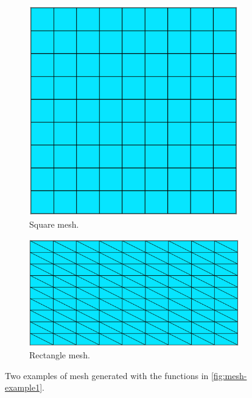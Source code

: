 \documentclass[headings=standardclasses, abstract=true]{scrartcl}
\begin{document}
\begin{figure}
    \centering
    \hfill
    \begin{subfigure}[c]{0.4\textwidth}
        \centering
        \includegraphics[width=\textwidth]{figures/square_mesh.png}

        \caption{Square mesh.}
        \label{fig:square}
    \end{subfigure}
    \hspace{0.1\textwidth}
    \begin{subfigure}[c]{0.4\textwidth}
        \centering
        \includegraphics[width=\textwidth]{figures/rectangle_mesh.png}
        \caption{Rectangle mesh.}
        \label{fig:rectangle}
    \end{subfigure}
    \caption{Two examples of mesh generated with the functions in \autoref{fig:mesh-example1}.}
    \label{fig:mesh}
    \hfill
\end{figure}
\end{document}
